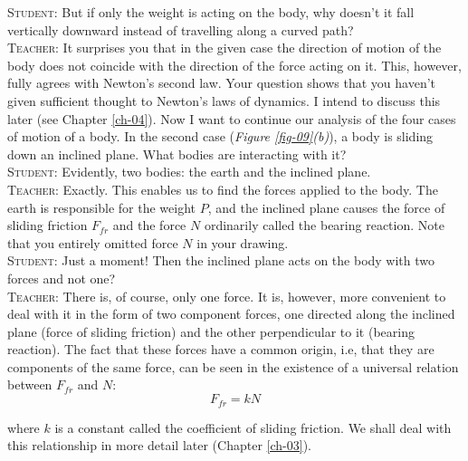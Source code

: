 \documentclass[a4paper,sfsidenotes]{tufte-book}
\begin{document}
\textsc{Student:} But if only the weight is acting on the body, why doesn't it fall vertically downward instead of travelling along a curved path? \\

\textsc{Teacher:} It surprises you that in the given case the direction of motion of the body does not coincide with the direction of the force acting on it. This, however, fully agrees with Newton's second law. Your question shows that you haven't given sufficient thought to Newton's laws of dynamics. I intend to discuss this later (see  Chapter \ref{ch-04}). Now I want to continue our analysis of the four cases of motion of a body. In the second case (\emph{Figure \ref{fig-09}(b)}), a body is sliding down an inclined plane. What bodies are interacting with it?
\\
\textsc{Student:} Evidently, two bodies: the earth and the inclined plane. \\

\textsc{Teacher:} Exactly. This enables us to find the forces applied to the body. The earth is responsible for the weight $P$, and the inclined plane causes the force of sliding friction $F_{fr}$
and the force $N$ ordinarily called the bearing reaction. Note that you entirely omitted force $N$ in your drawing.\\

\textsc{Student:} Just a moment! Then the inclined plane acts on the body with two forces and not one?\\

\textsc{Teacher:} There is, of course, only one force. It is, however, more convenient to deal with it in the form of two component forces, one directed along the inclined plane (force of sliding friction) and the other perpendicular to it (bearing reaction). The fact that these forces have a common origin, i.e, that they are components of the same force, can be seen in the existence
of a universal relation between $F_{fr}$ and $N$:
\begin{equation}
F_{fr}=kN
\label{eq-005}
\end{equation}

where $k$ is a constant called the coefficient of sliding friction. We shall deal with this relationship in more detail later (Chapter \ref{ch-03}). \\
\end{document}
